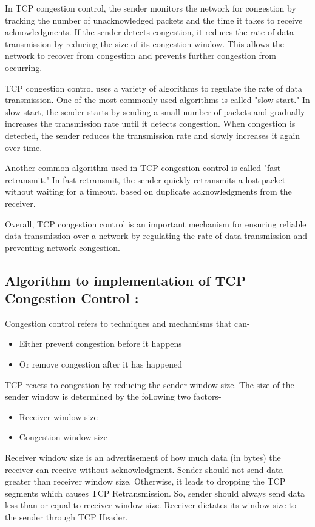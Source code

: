 \documentclass[11pt]{article}
\begin{document}
In TCP congestion control, the sender monitors the network for congestion by tracking the number of unacknowledged packets and the time it takes to receive acknowledgments. If the sender detects congestion, it reduces the rate of data transmission by reducing the size of its congestion window. This allows the network to recover from congestion and prevents further congestion from occurring.

TCP congestion control uses a variety of algorithms to regulate the rate of data transmission. One of the most commonly used algorithms is called "slow start." In slow start, the sender starts by sending a small number of packets and gradually increases the transmission rate until it detects congestion. When congestion is detected, the sender reduces the transmission rate and slowly increases it again over time.

Another common algorithm used in TCP congestion control is called "fast retransmit." In fast retransmit, the sender quickly retransmits a lost packet without waiting for a timeout, based on duplicate acknowledgments from the receiver.

Overall, TCP congestion control is an important mechanism for ensuring reliable data transmission over a network by regulating the rate of data transmission and preventing network congestion.


\subsection{Algorithm to implementation of TCP Congestion Control : }

Congestion control refers to techniques and mechanisms that can-

\begin{itemize}
    \item Either prevent congestion before it happens
    \item Or remove congestion after it has happened
\end{itemize}

TCP reacts to congestion by reducing the sender window size. The size of the sender window is determined by the following two factors-
\begin{itemize}
    \item Receiver window size
    \item Congestion window size
\end{itemize}

Receiver window size is an advertisement of how much data (in bytes) the receiver can receive without acknowledgment. Sender should not send data greater than receiver window size. Otherwise, it leads to dropping the TCP segments which causes TCP Retransmission. So, sender should always send data less than or equal to receiver window size. Receiver dictates its window size to the sender through TCP Header.
 
\end{document}
